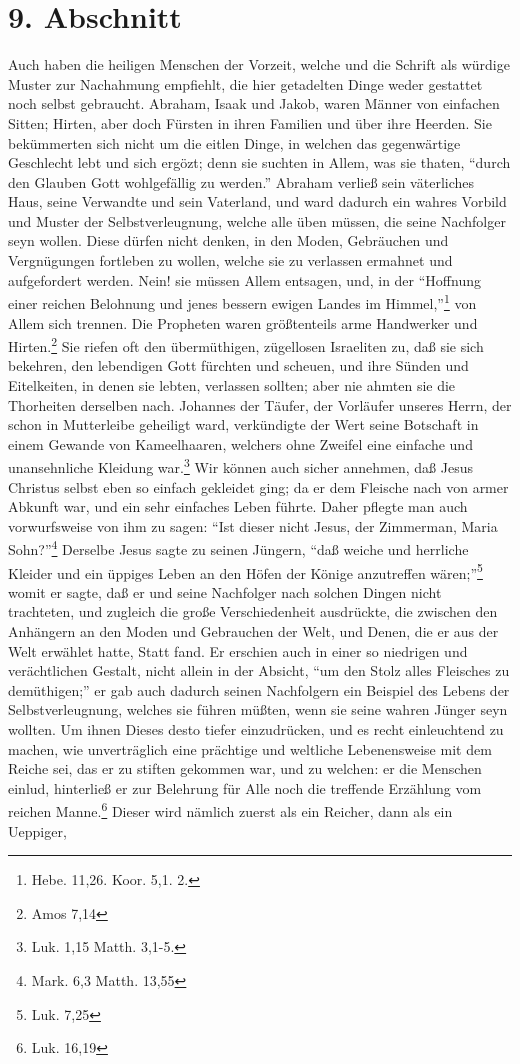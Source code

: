 \section{9. Abschnitt}

Auch haben die heiligen Menschen der Vorzeit, welche und die Schrift als würdige Muster zur Nachahmung empfiehlt, die hier getadelten Dinge weder gestattet noch selbst gebraucht. Abraham, Isaak und Jakob, waren Männer von einfachen Sitten; Hirten, aber doch Fürsten in ihren Familien und über ihre Heerden. Sie bekümmerten sich nicht um die eitlen Dinge, in welchen das gegenwärtige Geschlecht lebt und sich ergözt; denn sie suchten in Allem, was sie thaten, "`durch den Glauben Gott wohlgefällig zu werden."' Abraham verließ sein väterliches Haus, seine Verwandte und sein Vaterland, und ward dadurch ein wahres Vorbild und Muster der Selbstverleugnung, welche alle üben müssen, die seine Nachfolger seyn wollen. Diese dürfen nicht denken, in den Moden, Gebräuchen und Vergnügungen fortleben zu wollen, welche sie zu verlassen ermahnet und aufgefordert werden. Nein! sie müssen Allem entsagen, und, in der "`Hoffnung einer reichen Belohnung und jenes bessern ewigen Landes im Himmel,"'\footnote{Hebe. 11,26. Koor. 5,1. 2.} von Allem sich trennen. Die Propheten waren größtenteils arme Handwerker und Hirten.\footnote{Amos 7,14} Sie riefen oft den übermüthigen, zügellosen Israeliten zu, daß sie sich bekehren, den lebendigen Gott fürchten und scheuen, und ihre Sünden und Eitelkeiten, in denen sie lebten, verlassen sollten; aber nie ahmten sie die Thorheiten derselben nach. Johannes der Täufer, der Vorläufer unseres Herrn, der schon in Mutterleibe geheiligt ward, verkündigte der Wert seine Botschaft in einem Gewande von Kameelhaaren, welchers ohne Zweifel eine einfache und unansehnliche Kleidung war.\footnote{Luk. 1,15 Matth. 3,1-5.} Wir können auch sicher annehmen, daß Jesus Christus selbst eben so einfach gekleidet ging; da er dem Fleische nach von armer Abkunft war, und ein sehr einfaches Leben führte. Daher pflegte man auch vorwurfsweise von ihm zu sagen: "`Ist dieser nicht Jesus, der Zimmerman, Maria Sohn?"'\footnote{Mark. 6,3 Matth. 13,55} Derselbe Jesus sagte zu seinen Jüngern, "`daß weiche und herrliche Kleider und ein üppiges Leben an den Höfen der Könige anzutreffen wären;"'\footnote{Luk. 7,25} womit er sagte, daß er und seine Nachfolger nach solchen Dingen nicht trachteten, und zugleich die große Verschiedenheit ausdrückte, die zwischen den Anhängern an den Moden und Gebrauchen der Welt, und Denen, die er aus der Welt erwählet hatte, Statt fand. Er erschien auch in einer so niedrigen und verächtlichen Gestalt, nicht allein in der Absicht, "`um den Stolz alles Fleisches zu demüthigen;"' er gab auch dadurch seinen Nachfolgern ein Beispiel des Lebens der Selbstverleugnung, welches sie führen müßten, wenn sie seine wahren Jünger seyn wollten. Um ihnen Dieses desto tiefer einzudrücken, und es recht einleuchtend zu machen, wie unverträglich eine prächtige und weltliche Lebenensweise mit dem Reiche sei, das er zu stiften gekommen war, und zu welchen: er die Menschen einlud, hinterließ er zur Belehrung für Alle noch die treffende Erzählung vom reichen Manne.\footnote{Luk. 16,19} Dieser wird nämlich zuerst als ein Reicher, dann als ein Ueppiger, 